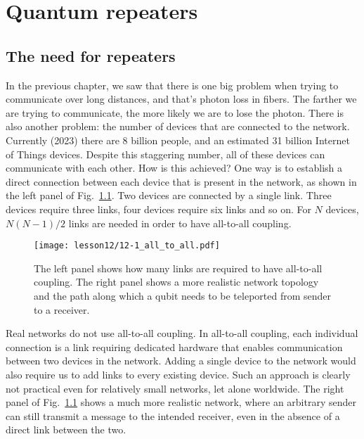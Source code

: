 \chapter{Quantum repeaters}
\label{sec:12_quantum_repeaters}

\section{The need for repeaters}
\label{sec:12-1_need_for_repeaters}

In the previous chapter, we saw that there is one big problem when trying to communicate over long distances, and that's photon loss in fibers.
The farther we are trying to communicate, the more likely we are to lose the photon.
There is also another problem: the number of devices that are connected to the network. Currently (2023) there are 8 billion people, and an estimated 31 billion Internet of Things devices.
Despite this staggering number, all of these devices can communicate with each other.
How is this achieved?
One way is to establish a direct connection between each device that is present in the network, as shown in the left panel of Fig.~\ref{fig:12-1_all_to_all}.
Two devices are connected by a single link.
Three devices require three links, four devices require six links and so on.
For $N$ devices, $N (N - 1) / 2$ links are needed in order to have all-to-all coupling.

\begin{figure}[t]
    \centering
    \texttt{[image: lesson12/12-1\_all\_to\_all.pdf]}
    \caption[All-to-all coupling between network nodes.]{The left panel shows how many links are required to have all-to-all coupling. The right panel shows a more realistic network topology and the path along which a qubit needs to be teleported from sender to a receiver.}
    \label{fig:12-1_all_to_all}
\end{figure}

Real networks do not use all-to-all coupling.
In all-to-all coupling, each individual connection is a link requiring dedicated hardware that enables communication between two devices in the network.
Adding a single device to the network would also require us to add links to every existing device.
Such an approach is clearly not practical even for relatively small networks, let alone worldwide.
The right panel of Fig.~\ref{fig:12-1_all_to_all} shows a much more realistic network, where an arbitrary sender can still transmit a message to the intended receiver, even in the absence of a direct link between the two.


